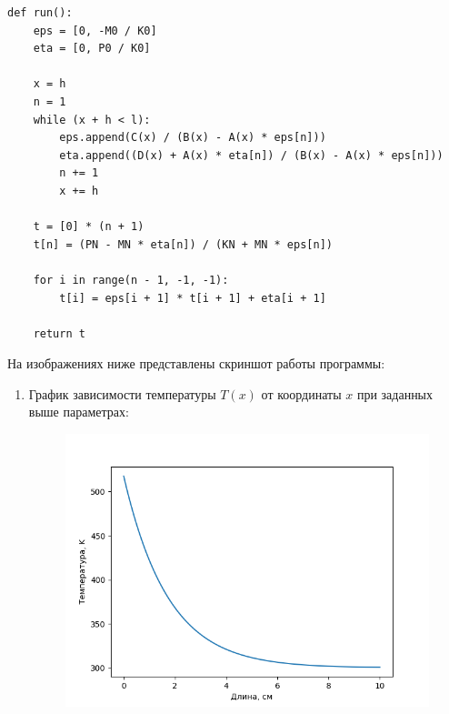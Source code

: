 \lstset{language=python}
\begin{lstlisting}[caption=Метод прогонки]
def run():
    eps = [0, -M0 / K0]
    eta = [0, P0 / K0]

    x = h
    n = 1
    while (x + h < l):
        eps.append(C(x) / (B(x) - A(x) * eps[n]))
        eta.append((D(x) + A(x) * eta[n]) / (B(x) - A(x) * eps[n]))
        n += 1
        x += h

    t = [0] * (n + 1)
    t[n] = (PN - MN * eta[n]) / (KN + MN * eps[n])

    for i in range(n - 1, -1, -1):
        t[i] = eps[i + 1] * t[i + 1] + eta[i + 1]

    return t
\end{lstlisting}

На изображениях ниже представлены скриншот работы программы:
\begin{enumerate}
    \item График зависимости температуры $T(x)$ от координаты $x$ при заданных выше параметрах:
\begin{figure}[H]
    \centering
    \includegraphics[scale=0.9]{data/pdf/Figure_1.png}
\end{figure}


\end{enumerate}
